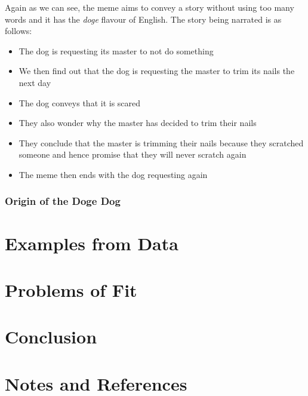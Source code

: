 \documentclass{article}
\begin{document}
Again as we can see, the meme aims to convey a story without using too many words and it has the \textit{doge} flavour of English. The story being narrated is as follows:
\begin{itemize}
    \item The dog is requesting its master to not do something
    \item We then find out that the dog is requesting the master to trim its nails the next day
    \item The dog conveys that it is scared
    \item They also wonder why the master has decided to trim their nails
    \item They conclude that the master is trimming their nails because they scratched someone and hence promise that they will never scratch again
    \item The meme then ends with the dog requesting again
\end{itemize}


\subsubsection{Origin of the Doge Dog}



\section{Examples from Data}

\section{Problems of Fit}

\section{Conclusion}

\section{Notes and References}
    
\end{document}
